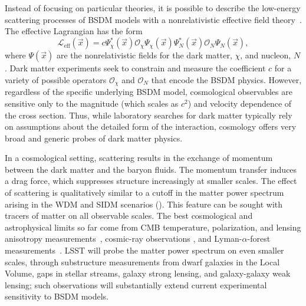 Instead of focusing on particular theories, it is possible to describe the low-energy scattering processes of BSDM models with a nonrelativistic effective field theory~\citep{Fan:2010gt,Fitzpatrick:2012ix,Anand:2013yka}.
The effective Lagrangian has the form
\begin{equation}
    \mathcal{L}_\textrm{eff}(\vec{x})
    = c \Psi_\chi^\ast (\vec{x}) \mathcal{O}_\chi \Psi_\chi (\vec{x})
    \Psi_N^\ast (\vec{x}) \mathcal{O}_N \Psi_N (\vec{x}) ,
\end{equation}
where $\Psi (\vec{x})$ are the nonrelativistic fields for the dark matter, $\chi$, and nucleon, $N$.
Dark matter experiments seek to constrain and measure the coefficient $c$ for a variety of possible operators $\mathcal{O}_\chi$ and $\mathcal{O}_N$ that encode the BSDM physics.
However, regardless of the specific underlying BSDM model, cosmological observables are sensitive only to the magnitude (which scales as $c^2$) and velocity dependence of the cross section.
Thus, while laboratory searches for dark matter typically rely on assumptions about the detailed form of the interaction, cosmology offers very broad and generic probes of dark matter physics.

In a cosmological setting, scattering results in the exchange of momentum between the dark matter and the baryon fluids.
The momentum transfer induces a drag force, which suppresses structure increasingly at smaller scales. 
The effect of scattering is qualitatively similar to a cutoff in the matter power spectrum arising in the WDM and SIDM scenarios ().
This feature can be sought with tracers of matter on all observable scales. 
The best cosmological and astrophysical limits so far come from CMB temperature, polarization, and lensing anisotropy measurements~\citep{Xu:2018efh,Boddy:2018kfv,Gluscevic:2017ywp,Boddy:2018wzy,Slatyer:2018aqg}, cosmic-ray observations \citep{Cappiello:2018hsu}, and Lyman-$\alpha$-forest measurements~\citep{Dvorkin:2013cea,Xu:2018efh}. 
LSST will probe the matter power spectrum on even smaller scales, through substructure measurements from dwarf galaxies in the Local Volume, gaps in stellar streams, galaxy strong lensing, and galaxy-galaxy weak lensing; such observations will substantially extend current experimental sensitivity to BSDM models.


